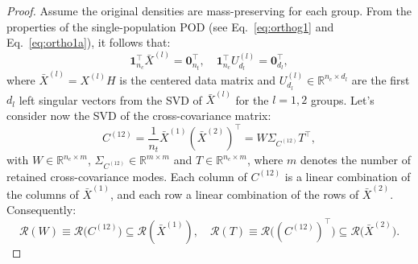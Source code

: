 \documentclass[10pt,a4paper]{amsart}
\begin{document}
\begin{proof}
Assume the original densities are mass-preserving for each group. From the properties of the single-population POD (see Eq.~\eqref{eq:orthog1} and Eq.~\eqref{eq:ortho1a}), it follows that:
\begin{equation} \label{eq:singlePop_ortho}
   \mathbf{1}_{n_c}^\top \bar{X}^{(l)}=\boldsymbol{0}^\top_{n_t}, \quad \mathbf{1}_{n_c}^\top U^{(l)}_{d_l} = \mathbf{0}_{d_l}^\top, 
\end{equation}
where $\bar{X}^{(l)}=X^{(l)}H$ is the centered data matrix and $U_{d_l}^{(l)}\in \mathbb{R}^{n_c\times d_l}$ are the first $d_l$ left singular vectors from the SVD of $\bar X^{(l)}$ for the $l=1,2$ groups. Let's consider now the SVD of the cross-covariance matrix: 
\begin{equation}
    C^{(12)} = \frac{1}{n_t}\bar X^{(1)} \left(\bar X^{(2)}\right)^\top= W \Sigma_{C^{(12)}} T^{\top}, %
    \label{Eq:Cross-cov_SVD}
\end{equation}
with $W \in \mathbb{R}^{n_c \times m}$, $\Sigma_{C^{(12)}} \in \mathbb{R}^{m \times m}$ and $T \in \mathbb{R}^{n_c \times m}$, where $m$ denotes the number of retained cross-covariance modes. Each column of $C^{(12)}$ is a linear combination of the columns of $\bar X^{(1)}$, and each row a linear combination of the rows of $\bar X^{(2)}$. Consequently:
\begin{equation}
\mathcal{R}(W)\equiv \mathcal{R}\big(C^{(12)}\big) \subseteq \mathcal{R}(\bar{X}^{(1)}), %
\quad 
\mathcal{R}(T)\equiv\mathcal{R}\big((C^{(12)})^\top\big) \subseteq \mathcal{R}\big(\bar{X}^{(2)}\big). %
\end{equation}


\end{proof}
\end{document}
